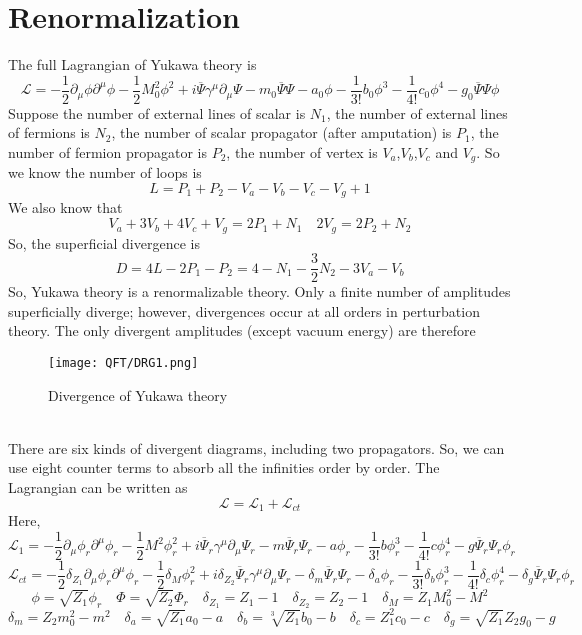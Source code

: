 \section{Renormalization}
\noindent
The full Lagrangian of Yukawa theory is
\[\mathcal{L} = -\frac{1}{2}\partial_{\mu} \phi \partial^{\mu} \phi -\frac{1}{2}M_0^2 \phi^2 + i\overline{\Psi} \gamma^{\mu} \partial_{\mu} \Psi - m_0\overline{\Psi}\Psi - a_0\phi -\frac{1}{3!}b_0\phi^3 -\frac{1}{4!}c_0 \phi^4 -g_0 \overline{\Psi}\Psi\phi\]
Suppose the number of external lines of scalar is $N_1$, the number of external lines of fermions is $N_2$, the number of scalar propagator (after amputation) is $P_1$, the number of fermion propagator is $P_2$, the number of vertex is $V_a$,$V_b$,$V_c$ and $V_g$. So we know the number of loops is
\[L = P_1+P_2-V_a -V_b-V_c-V_g+1\]
We also know that
\[V_a + 3V_b + 4V_c + V_g = 2P_1 + N_1  \quad 2V_g = 2P_2 + N_2\]
So, the superficial divergence is 
\[D = 4L - 2P_1 - P_2 = 4 -N_1 - \frac{3}{2}N_2 - 3V_a - V_b\]
So, Yukawa theory is a renormalizable theory. Only a finite number of amplitudes superficially diverge; however, divergences occur at all orders in perturbation theory. The only divergent amplitudes (except vacuum energy) are therefore
\begin{figure}[!h]
\centering
\texttt{[image: QFT/DRG1.png]}
\caption{Divergence of Yukawa theory}
\end{figure}\\
There are six kinds of divergent diagrams, including two propagators. So, we can use eight counter terms to absorb all the infinities order by order. The Lagrangian can be written as
\[\mathcal{L} = \mathcal{L}_1 + \mathcal{L}_{ct}\]
Here,
\[\mathcal{L}_1 = -\frac{1}{2}\partial_{\mu} \phi_r \partial^{\mu} \phi_r -\frac{1}{2}M^2 \phi_r^2 + i\overline{\Psi}_r \gamma^{\mu} \partial_{\mu} \Psi_r - m \overline{\Psi}_r \Psi_r - a\phi_r- \frac{1}{3!}b\phi_r^3 -\frac{1}{4!}c \phi_r^4 -g \overline{\Psi}_r\Psi_r\phi_r \]
\[\mathcal{L}_{ct} = -\frac{1}{2}\delta_{Z_1}\partial_{\mu} \phi_r \partial^{\mu} \phi_r -\frac{1}{2}\delta_M \phi_r^2 + i\delta_{Z_2}\overline{\Psi}_r \gamma^{\mu} \partial_{\mu} \Psi_r - \delta_m \overline{\Psi}_r \Psi_r - \delta_a\phi_r- \frac{1}{3!}\delta_b\phi_r^3 -\frac{1}{4!}\delta_c \phi_r^4 -\delta_g \overline{\Psi}_r\Psi_r\phi_r \]
\[\phi = \sqrt{Z_1}\phi_r \quad \Phi  = \sqrt{Z_2}\Phi_r \quad \delta_{Z_1} = Z_1 - 1 \quad \delta_{Z_2} = Z_2 - 1 \quad \delta_M = Z_1 M_0^2 - M^2\]
\[\delta_m = Z_2 m_0^2 - m^2 \quad \delta_a = \sqrt{Z_1}a_0 - a \quad \delta_b = \sqrt[3]{Z_1} b_0 - b \quad \delta_c= Z_1^2 c_0 - c \quad \delta_g = \sqrt{Z_1}Z_2 g_0 - g\]

